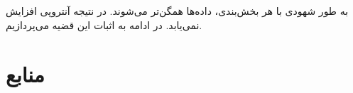 \documentclass{article}
\begin{document}
\section{}
به طور شهودی با هر بخش‌بندی، داده‌ها همگن‌تر می‌شوند. در نتیجه آنتروپی افزایش نمی‌یابد. در ادامه به اثبات این قضیه می‌پردازیم.







\section*{منابع}
\renewcommand{\section}[2]{}%
\begin{thebibliography}{99} %


\begin{LTRitems}

\resetlatinfont

\end{LTRitems}

\end{thebibliography}
\end{document}
